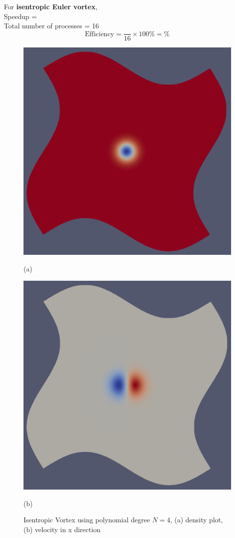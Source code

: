 \hspace{-18pt}For \textbf{isentropic Euler vortex},\\
Speedup = \\
Total number of processes = 16
\begin{equation*}
    \text{Efficiency} = \frac{}{16} \times 100 \% =  \%   
\end{equation*}
\begin{figure}[!ht]
    \centering
    \begin{minipage}{0.5\textwidth}
        \centering
        \includegraphics[width=0.9\linewidth]{attachments/solution_068877.png}
        \caption*{(a)}
    \end{minipage}%
    \begin{minipage}{0.5\textwidth}
        \centering
        \includegraphics[width=0.9\linewidth]{attachments/solution_068877_vx.png}
        \caption*{(b)}
    \end{minipage}
    \caption{Isentropic Vortex using polynomial degree $N = 4$, (a) density plot, (b) velocity in x direction}
\end{figure}
